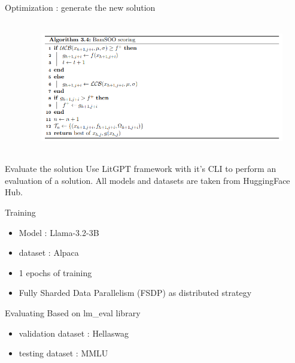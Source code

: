 \begin{frame}[allowframebreaks]{Optimization : generate the new solution}
\begin{columns}
\begin{column}{0.5\textwidth}
        \end{column}        
        \begin{column}{0.5\textwidth}
            \begin{figure}[h]
                \centering
                \includegraphics[height = 5cm]{imgs/algo/bamsoo_score.png}
            \end{figure}
        \end{column}
    \end{columns}

        
\end{frame}



\begin{frame}{Evaluate the solution}
    Use LitGPT framework with it's CLI to perform an evaluation of a solution. All models and datasets are taken from HuggingFace Hub.
    \begin{block}{Training}
        \begin{itemize}
            \item Model : Llama-3.2-3B
            \item dataset : Alpaca
            \item 1 epochs of training
            \item Fully Sharded Data Parallelism (FSDP) as distributed strategy
        \end{itemize}
    \end{block}

    \begin{block}{Evaluating}
        Based on lm\_eval library
        \begin{itemize}
            \item validation dataset : Hellaswag
            \item testing dataset : MMLU
        \end{itemize}
    \end{block}

    
\end{frame}